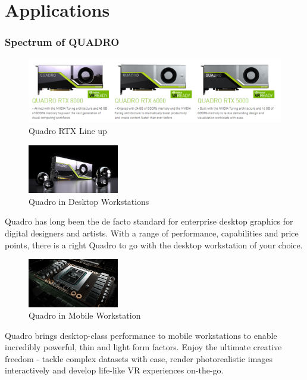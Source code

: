 \documentclass[xcolor=x11names,table]{beamer}
\begin{document}
\section{Applications}
    \begin{frame}[allowframebreaks]
    \frametitle{Spectrum of QUADRO}
        \begin{figure}
            \centering
            \includegraphics[width=\linewidth]{refs/latest_quadro_rtx_lineup.png}
            \caption{Quadro RTX Line up}
        \end{figure}
        \begin{block}{
            \begin{figure}[H]
            	\includegraphics[width=150px]{refs/quadro-design-vis-quadro-rtx-8000-625-u@2x.jpg}
            	\caption{{\footnotesize Quadro in Desktop Workstations}}
            \end{figure}
            }
            {
            Quadro has long been the \gls{de facto standard} for enterprise desktop graphics for digital designers and artists. With a range of performance, capabilities and price points, there is a right Quadro to go with the desktop workstation of your choice.
            }
        \end{block}
        \begin{block}{
            \begin{figure}[H]
            	\includegraphics[width=150px]{refs/quadro-whats-new-feature-mobile-625-ud@2x.jpg}
            	\caption{{\footnotesize Quadro in Mobile Workstation}}
            \end{figure}
            }
            {
                Quadro brings desktop-class performance to mobile workstations to enable incredibly powerful, thin and light form factors. Enjoy the ultimate creative freedom - tackle complex datasets with ease, render photorealistic images interactively and develop life-like VR experiences on-the-go.
}
\end{block}
\end{frame}
\end{document}
